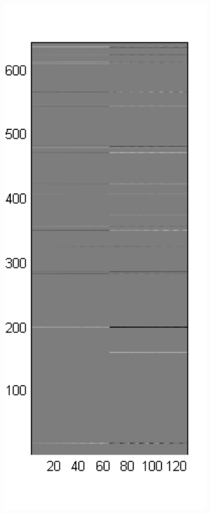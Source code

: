 \documentclass{article} %
\begin{document}
\begin{figure}[t]
\begin{subfigure}[b]{0.2\textwidth}
	\includegraphics[width=1.0\textwidth]{./var_params_lag_5.png}

\end{subfigure}
\end{figure}
\end{document}
